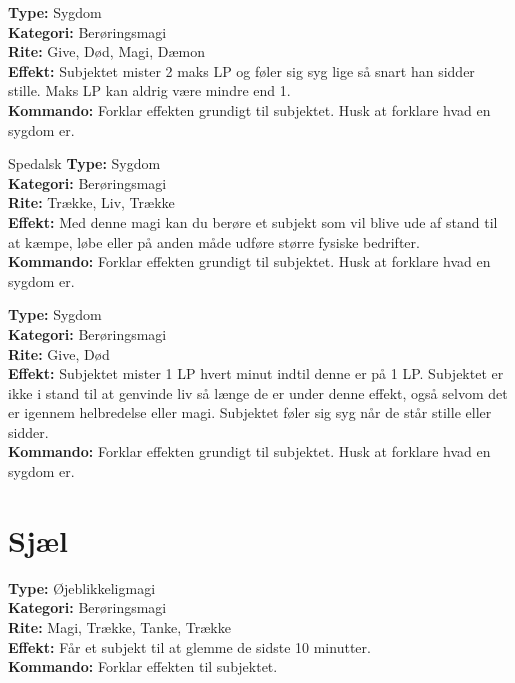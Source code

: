 \begin{sygdom*}[Feber]
\textbf{Type:} Sygdom\\
\textbf{Kategori:} Berøringsmagi\\
\textbf{Rite:} Give, Død, Magi, Dæmon\\
\textbf{Effekt:} Subjektet mister 2 maks LP og føler sig syg lige så snart han sidder stille. Maks LP kan aldrig være mindre end 1.\\
\textbf{Kommando:} Forklar effekten grundigt til subjektet. Husk at forklare hvad en sygdom er.
\end{sygdom*}

\begin{sygdom*}Spedalsk
\textbf{Type:} Sygdom\\
\textbf{Kategori:} Berøringsmagi\\
\textbf{Rite:} Trække, Liv, Trække\\
\textbf{Effekt:} Med denne magi kan du berøre et subjekt som vil blive ude af stand til at kæmpe, løbe eller på anden måde udføre større fysiske bedrifter.\\
\textbf{Kommando:} Forklar effekten grundigt til subjektet. Husk at forklare hvad en sygdom er.
\end{sygdom*}

\begin{sygdom*}[Pest]
\textbf{Type:} Sygdom\\
\textbf{Kategori:} Berøringsmagi\\
\textbf{Rite:} Give, Død\\
\textbf{Effekt:} Subjektet mister 1 LP hvert minut indtil denne er på 1 LP. Subjektet er ikke i stand til at genvinde liv så længe de er under denne effekt, også selvom det er igennem helbredelse eller magi. Subjektet føler sig syg når de står stille eller sidder.\\
\textbf{Kommando:} Forklar effekten grundigt til subjektet. Husk at forklare hvad en sygdom er.
\end{sygdom*}

\section*{Sjæl}
\begin{nSjæl*}[Glemsel]
\textbf{Type:} Øjeblikkeligmagi\\
\textbf{Kategori:} Berøringsmagi\\
\textbf{Rite:} Magi, Trække, Tanke, Trække\\
\textbf{Effekt:} Får et subjekt til at glemme de sidste 10 minutter.\\
\textbf{Kommando:} Forklar effekten til subjektet.
\end{nSjæl*}

